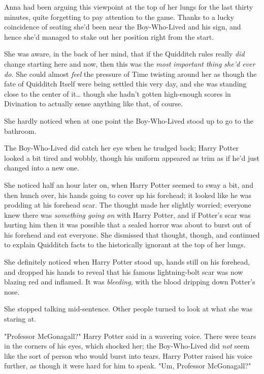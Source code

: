 Anna had been arguing this viewpoint at the top of her lungs for the last
thirty minutes, quite forgetting to pay attention to the game. Thanks to a
lucky coincidence of seating she'd been near the Boy-Who-Lived and his sign,
and hence she'd managed to stake out her position right from the start.

She was aware, in the back of her mind, that if the Quidditch rules really
\emph{did} change starting here and now, then this was the \emph{most important
thing she'd ever do.} She could almost \emph{feel} the pressure of Time
twisting around her as though the fate of Quidditch Itself were being settled
this very day, and she was standing close to the center of it{\ldots} though
she hadn't gotten high-enough scores in Divination to actually sense anything
like that, of course.

She hardly noticed when at one point the Boy-Who-Lived stood up to go to the
bathroom.

The Boy-Who-Lived did catch her eye when he trudged back; Harry Potter looked a
bit tired and wobbly, though his uniform appeared as trim as if he'd just
changed into a new one.

She noticed half an hour later on, when Harry Potter seemed to sway a bit, and
then hunch over, his hands going to cover up his forehead; it looked like he
was prodding at his forehead scar. The thought made her slightly worried;
everyone knew there was \emph{something going on} with Harry Potter, and if
Potter's scar was hurting him then it was possible that a sealed horror was
about to burst out of his forehead and eat everyone. She dismissed that
thought, though, and continued to explain Quidditch facts to the historically
ignorant at the top of her lungs.

She definitely noticed when Harry Potter stood up, hands still on his forehead,
and dropped his hands to reveal that his famous lightning-bolt scar was now
blazing red and inflamed. It was \emph{bleeding,} with the blood dripping down
Potter's nose.

She stopped talking mid-sentence. Other people turned to look at what she was
staring at.

"Professor McGonagall?" Harry Potter said in a wavering voice. There were tears
in the corners of his eyes, which shocked her; the Boy-Who-Lived did \emph{not}
seem like the sort of person who would burst into tears. Harry Potter raised
his voice further, as though it were hard for him to speak. "Um, Professor
McGonagall?"

